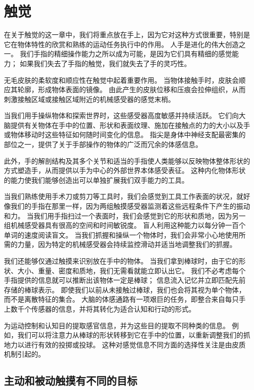 \chapter{触觉} \label{chap:chap19}

在关于触觉的这一章中，我们将重点放在手上，因为它对这种方式很重要，特别是它在物体特性的欣赏和熟练的运动任务执行中的作用。
人手是进化的伟大创造之一。
我们手指的精细操作能力之所以成为可能，是因为它们具有精细的感觉能力；
如果我们失去了手指的触觉，我们就失去了手的灵巧性。


无毛皮肤的柔软度和顺应性在触觉中起着重要作用。
当物体接触手时，皮肤会顺应其轮廓，形成物体表面的镜像。
由此产生的皮肤位移和压痕会拉伸组织，从而刺激接触区域或接触区域附近的机械感受器的感觉末梢。


当我们用手操纵物体和探索世界时，这些感受器高度敏感并持续活跃。
它们向大脑提供有关物体在手中的位置、形状和表面纹理、施加在接触点的力的大小以及手或物体移动时这些特征如何随时间变化的信息。
指尖是身体中神经支配最密集的部位之一，提供了关于手部操作的物体的广泛而冗余的体感信息。


此外，手的解剖结构及其多个关节和适当的手指使人类能够以反映物体整体形状的方式塑造手，从而提供以手为中心的外部世界本体感受表征。
这种内化物体形状的能力使我们能够创造出可以单独扩展我们双手能力的工具。


当我们熟练使用手术刀或剪刀等工具时，我们会感觉到工具工作表面的状况，就好像我们的手指在那里一样，因为两组触摸感受器监测着这些远程条件下产生的振动和力。
当我们用手指扫过一个表面时，我们会感觉到它的形状和质地，因为另一组机械感受器具有很高的空间和时间敏锐度。
盲人利用这种能力以每分钟一百个单词的速度阅读盲文。 
当我们抓握和操纵一个物体时，我们会非常小心地使用所需的力量，因为特定的机械感受器会持续监控滑动并适当地调整我们的抓握。


我们还能够仅通过触摸来识别放在手中的物体。
当我们拿到棒球时，由于它的形状、大小、重量、密度和质地，我们无需看就能立即认出它。
我们不必考虑每个手指提供的信息就可以推断出该物体一定是棒球；
信息流入记忆并立即匹配先前存储的棒球表示。
即使我们以前从未接触过棒球，我们也会将其视为单个物体，而不是离散特征的集合。
大脑的体感通路有一项艰巨的任务，即整合来自每只手上数千个传感器的信息，并将其转化为适合认知和行动的形式。


为运动控制和认知目的提取感官信息，并为这些目的提取不同种类的信息。
例如，我们可以将注意力从棒球的形状转移到它在手中的位置，以重新调整我们的抓地力以进行有效的投掷或投球。
这种对感觉信息不同方面的选择性关注是由皮质机制引起的。



\section{主动和被动触摸有不同的目标}

